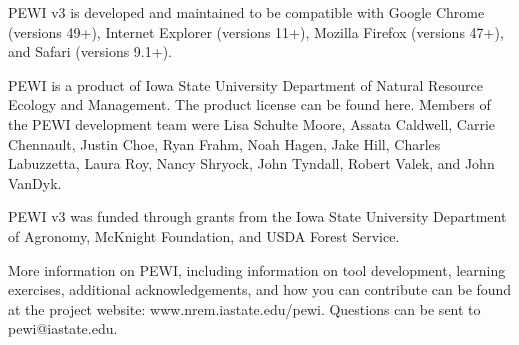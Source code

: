 \documentclass[11pt]{article}
\begin{document}
PEWI v3 is developed and maintained to be compatible with Google Chrome (versions 49+), Internet Explorer (versions 11+), Mozilla Firefox (versions 47+), and Safari (versions 9.1+).

PEWI is a product of Iowa State University Department of Natural Resource Ecology and Management. The product license can be found here. Members of the PEWI development team were Lisa Schulte Moore, Assata Caldwell, Carrie Chennault, Justin Choe, Ryan Frahm, Noah Hagen, Jake Hill, Charles Labuzzetta, Laura Roy, Nancy Shryock, John Tyndall, Robert Valek, and John VanDyk.

PEWI v3 was funded through grants from the Iowa State University Department of Agronomy, McKnight Foundation, and USDA Forest Service.

More information on PEWI, including information on tool development, learning exercises, additional acknowledgements, and how you can contribute can be found at the project website: www.nrem.iastate.edu/pewi. Questions can be sent to pewi@iastate.edu. 

\newpage
\end{document}
